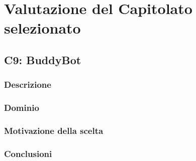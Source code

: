 \section{Valutazione del Capitolato selezionato}


\subsection{C9: BuddyBot}

\subsubsection{Descrizione}

\subsubsection{Dominio}

\subsubsection{Motivazione della scelta}

\subsubsection{Conclusioni}
